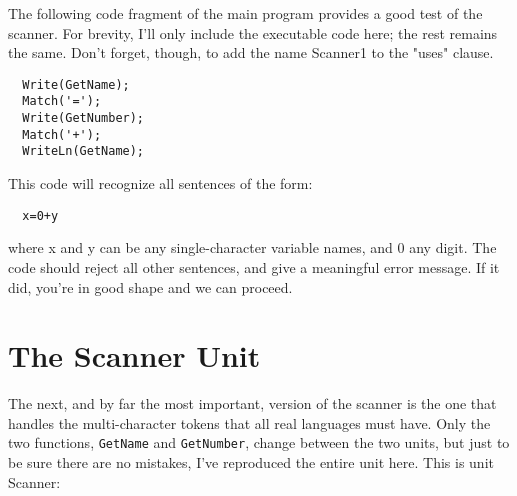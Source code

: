 The following code fragment of the main program provides a good test of the scanner. For brevity, I'll only include the executable code here; the rest remains the same. Don't forget, though, to add the name Scanner1 to the "uses" clause.

\begin{verbatim}
  Write(GetName);
  Match('=');
  Write(GetNumber);
  Match('+');
  WriteLn(GetName);
\end{verbatim}

This code will recognize all sentences of the form:

\begin{verbatim}
  x=0+y
\end{verbatim}  

where x and y can be any single-character variable names, and 0 any digit. The code should reject all other sentences, and give a meaningful error message. If it did, you're in good shape and we can proceed.

\section{The Scanner Unit}

The next, and by far the most important, version of the scanner is the one that handles the multi-character tokens that all real languages must have. Only the two functions, {\tt GetName} and {\tt GetNumber}, change between the two units, but just to be sure there are no mistakes, I've reproduced the entire unit here. This is unit Scanner:


